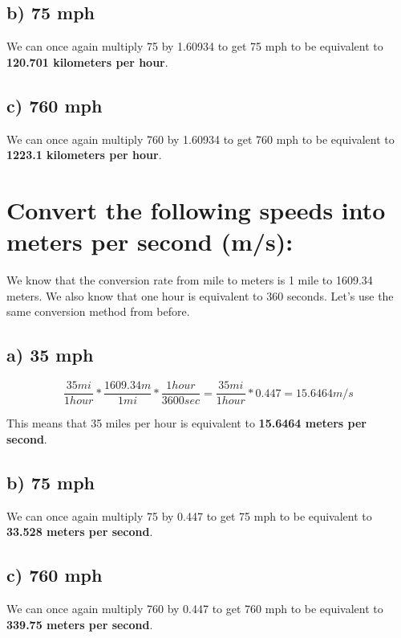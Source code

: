 \documentclass[]{article}
\begin{document}
\subsection{b) 75 mph}\label{b-75-mph}

We can once again multiply 75 by 1.60934 to get 75 mph to be equivalent
to \textbf{120.701 kilometers per hour}.

\subsection{c) 760 mph}\label{c-760-mph}

We can once again multiply 760 by 1.60934 to get 760 mph to be
equivalent to \textbf{1223.1 kilometers per hour}.

\section{Convert the following speeds into meters per second
(m/s):}\label{convert-the-following-speeds-into-meters-per-second-ms}

We know that the conversion rate from mile to meters is 1 mile to
1609.34 meters. We also know that one hour is equivalent to 360 seconds.
Let's use the same conversion method from before.

\subsection{a) 35 mph}\label{a-35-mph-1}

\[\frac{35 mi}{1 hour} * \frac{1609.34 m}{1 mi} * \frac{1 hour}{3600 sec} = \frac{35 mi}{1 hour} * 0.447 = 15.6464 m/s\]

This means that 35 miles per hour is equivalent to \textbf{15.6464
meters per second}.

\subsection{b) 75 mph}\label{b-75-mph-1}

We can once again multiply 75 by 0.447 to get 75 mph to be equivalent to
\textbf{33.528 meters per second}.

\subsection{c) 760 mph}\label{c-760-mph-1}

We can once again multiply 760 by 0.447 to get 760 mph to be equivalent
to \textbf{339.75 meters per second}.
\end{document}
